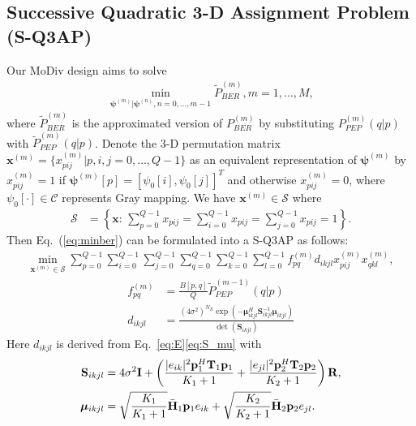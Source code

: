 \documentclass[journal]{IEEEtran}
\begin{document}
\subsection{Successive Quadratic 3-D Assignment Problem (S-Q3AP)}
\label{ssec:q3ap}
Our MoDiv design aims to solve
\begin{align}
  \min_{\bm{\psi}^{(m)}|\bm{\psi}^{(n)},
  n=0,\ldots,m-1}\tilde{P}_{BER}^{(m)},m=1,\ldots,M,\label{eq:minber}
\end{align}
where $\tilde{P}_{BER}^{(m)}$ is the approximated version of
$P_{BER}^{(m)}$ by substituting $P_{PEP}^{(m)}(q|p)$ with
$\tilde{P}_{PEP}^{(m)}(q|p)$. Denote the 3-D permutation matrix
$\mathbf{x}^{(m)} = \{x_{pij}^{(m)}|p,i,j=0,\ldots,Q-1\}$ as an equivalent
representation of $\bm{\psi}^{(m)}$ by $x_{pij}^{(m)} = 1$ if $
\bm{\psi}^{(m)}[p] = [\psi_0[i], \psi_0[j]]^T$ and otherwise $x_{pij}^{(m)} =
0$, where $\psi_0[\cdot]\in\mathcal{C}$ represents Gray mapping. We have
$\mathbf{x}^{(m)}\in\mathcal{S}$ where
\begin{align}
  \mathcal{S} & =
  \left\{\mathbf{x}:\,\sum_{p=0}^{Q-1}x_{pij}= \sum_{i=0}^{Q-1}x_{pij} =\sum_{j=0}^{Q-1}x_{pij} =1\right\}.
  \label{eq:constraint}
\end{align}
Then Eq.~(\ref{eq:minber}) can be formulated into a S-Q3AP as follows:
\begin{align}
  \min_{\mathbf{x}^{(m)}\in \mathcal{S}}
  \sum_{p=0}^{Q-1}\sum_{i=0}^{Q-1}\sum_{j=0}^{Q-1}
  \sum_{q=0}^{Q-1}\sum_{k=0}^{Q-1}\sum_{l=0}^{Q-1}
  f_{pq}^{(m)}d_{ikjl}x_{pij}^{(m)}x_{qkl}^{(m)},
  \label{eq:SQ3AP}
\end{align}
\begin{subequations}
  \begin{align}
    f_{pq}^{(m)} & = \frac{B[p,q]}{Q}\tilde{P}_{PEP}^{(m-1)}(q|p) \\
    d_{ikjl} & =
    \frac{(4\sigma^2)^{N_R}
    \exp(-\bm{\mu}_{ikjl}^H\mathbf{S}_{ikjl}^{-1}\bm{\mu}_{ikjl})} {\det(\mathbf{S}_{ikjl})}
  \end{align}
\end{subequations}
Here $d_{ikjl}$ is derived from Eq.~\eqref{eq:E}\eqref{eq:S_mu} with
\begin{align}
  \mathbf{S}_{ikjl} & = 4\sigma^2\mathbf{I} + \left(\frac{|e_{ik}|^2
  \mathbf{p}_1^H\mathbf{T}_1 \mathbf{p}_1}{K_1+1} + \frac{|e_{jl}|^2
  \mathbf{p}_2^H\mathbf{T}_2 \mathbf{p}_2}{K_2+1}\right) \mathbf{R},\notag\\
  \bm{\mu}_{ikjl} & = \sqrt{\frac{K_1}{K_1+1}}\bar{\mathbf{H}}_1\mathbf{p}_1
  e_{ik} + \sqrt{\frac{K_2}{K_2+1}}\bar{\mathbf{H}}_2\mathbf{p}_2e_{jl}.
\end{align}
\end{document}
